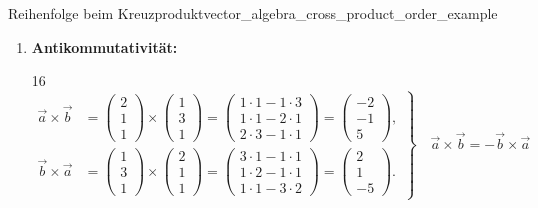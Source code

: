 \begin{ExampleBox}{Reihenfolge beim Kreuzprodukt}{vector_algebra_cross_product_order_example}
  \begin{enumerate}[label=\alph*),leftmargin=*,itemsep=1em]
    \item \textbf{Antikommutativität:}
      \begin{ClozeArea}[33]{16}
      \[
        \left.
        \begin{aligned}
          \vec a\times\vec b
            &=\begin{pmatrix}2\\1\\1\end{pmatrix}
              \times\begin{pmatrix}1\\3\\1\end{pmatrix}
              =\begin{pmatrix}
                1\cdot1-1\cdot3\\
                1\cdot1-2\cdot1\\
                2\cdot3-1\cdot1
              \end{pmatrix}
              =\begin{pmatrix}-2\\-1\\5\end{pmatrix},\\[1em]
          \vec b\times\vec a
            &=\begin{pmatrix}1\\3\\1\end{pmatrix}
              \times\begin{pmatrix}2\\1\\1\end{pmatrix}
              =\begin{pmatrix}
                3\cdot1-1\cdot1\\
                1\cdot2-1\cdot1\\
                1\cdot1-3\cdot2
              \end{pmatrix}
              =\begin{pmatrix}2\\1\\-5\end{pmatrix}.
        \end{aligned}
        \right\}
        \quad
        \vec a\times\vec b=-\vec b\times\vec a
      \]
      \end{ClozeArea}


\end{enumerate}
\end{ExampleBox}
